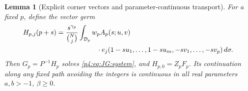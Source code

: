\documentclass[11pt,a4paper]{article}
\newtheorem{lemma}[theorem]{Lemma}
\theoremstyle{definition}
\theoremstyle{remark}
\numberwithin{equation}{section}
\begin{document}
\begin{lemma}[Explicit corner vectors and parameter-continuous transport]
\label{p4:lem:JG:vector}
For a fixed $p$, define the vector germ
\begin{align}
 H_{p,j}(p+s)={}&\frac{s^{\gamma_p}}{\binom Nj}
  \int_{\mathcal D_p}w_p A_p(s;u,v)\notag\\
 &\hspace{16mm}\cdot e_j(1-su_1,\ldots,1-su_m,-sv_1,\ldots,-sv_p)
                                                   \,d\sigma.
 \label{p4:eq:JG:corner-vector}
\end{align}
Then $G_p=P^{-1}H_p$ solves \eqref{p4:eq:JG:system}, and
$H_{p,0}=Z_pF_p$. Its continuation along any fixed path avoiding the
integers is continuous in all real parameters $a,b>-1$, $\beta\ge0$.
\end{lemma}
\end{document}
